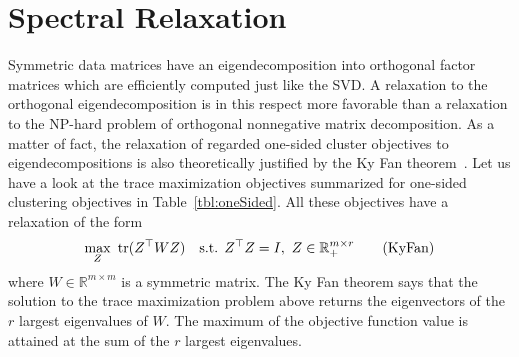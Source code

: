 \section{Spectral Relaxation}\label{sec:ZS:SpectralRelaxation}
Symmetric data matrices have an eigendecomposition into orthogonal factor matrices which are efficiently computed just like the SVD. A relaxation to the orthogonal eigendecomposition is in this respect more favorable than a relaxation to the NP-hard problem of orthogonal nonnegative matrix decomposition. 
As a matter of fact, the relaxation of regarded one-sided cluster objectives to eigendecompositions is also theoretically justified by the Ky Fan theorem~\citep{fan1949theorem}. Let us have a look at the trace maximization objectives summarized for one-sided clustering objectives in Table~\ref{tbl:oneSided}. All these objectives have a relaxation of the form 
\begin{align}
\max_Z&\ \operatorname*{tr}(Z^\top W Z) & \text{s.t. } Z^\top Z = I,\  Z\in\mathbb{R}_+^{m\times r} \label{eq:kyFan} \tag{KyFan}
\end{align}
where $W\in \mathbb{R}^{m\times m}$ is a symmetric matrix. The Ky Fan theorem says that the solution to the trace maximization problem above returns the eigenvectors of the $r$ largest eigenvalues of $W$. The maximum of the objective function value is attained at the sum of the $r$ largest eigenvalues. 

